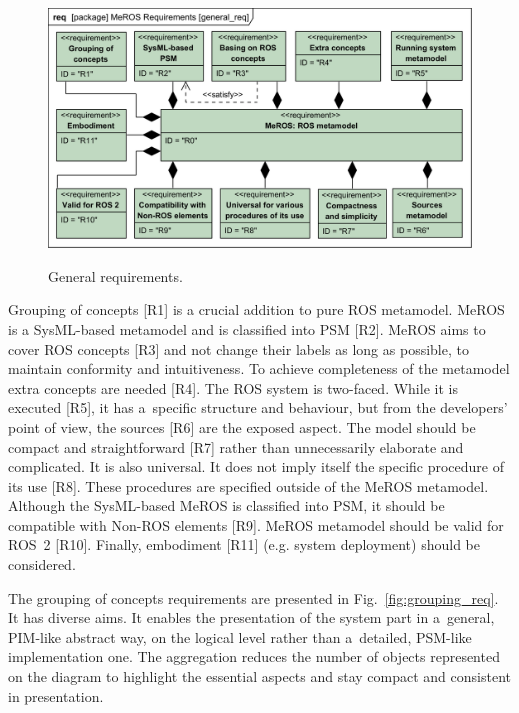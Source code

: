 \documentclass[11pt,oneside,a4paper]{report}
\begin{document}
	\begin{figure}[H]
		\centering
		\begin{center}
			{\includegraphics[scale=1.0]{diagrams/general_req.png}}
		\end{center}
		\caption{General requirements.}
		\label{fig:general_req}
	\end{figure}
		
	Grouping of concepts [R1] is a crucial addition to pure ROS metamodel. 
	MeROS is a  SysML-based metamodel and is classified into PSM [R2].
	 MeROS aims to cover ROS concepts [R3] and not change their labels as long as possible, to maintain conformity and intuitiveness. To achieve completeness of the metamodel extra concepts are needed [R4]. The ROS system is two-faced. While it is executed [R5], it has a~specific structure and behaviour, but from the developers' point of view, the sources [R6] are the exposed aspect. The model should be compact and straightforward [R7] rather than unnecessarily elaborate and complicated. It is also universal. It does not imply itself the specific procedure of its use [R8]. These procedures are specified outside of the MeROS metamodel. Although the SysML-based MeROS is classified into PSM, it should be compatible with Non-ROS elements [R9]. MeROS metamodel should be valid for ROS~2 [R10]. Finally, embodiment [R11] (e.g. system deployment) should be considered.
	
	The grouping of concepts requirements are presented in Fig.~\ref{fig:grouping_req}. It has diverse aims. It enables the presentation of the system part in a~general, PIM-like abstract way, on the logical level rather than a~detailed, PSM-like implementation one. The aggregation reduces the number of objects represented on the diagram to highlight the essential aspects and stay compact and consistent in presentation.
	
\end{document}
